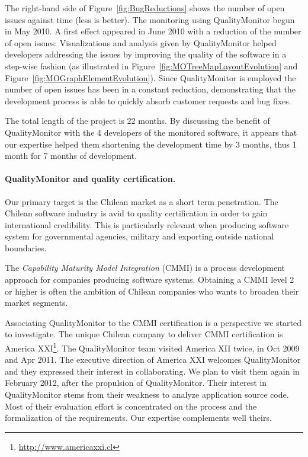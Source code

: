 \documentclass[runningheads]{llncs}
\newcommand{\figref}[1]{Figure~\ref{fig:#1}}
\begin{document}
The right-hand side of \figref{BugReductions} shows the number of open issues against time (less is better). The monitoring using QualityMonitor begun in May 2010. A first effect appeared in June 2010 with a reduction of the number of open issues: Visualizations and analysis given by QualityMonitor helped developers addressing the issues by improving the quality of the software in a step-wise fashion (as illustrated in \figref{MOTreeMapLayoutEvolution} and \figref{MOGraphElementEvolution}). Since QualityMonitor is employed the number of open issues has been in a constant reduction, demonstrating that the development process is able to quickly absorb customer requests and bug fixes.

The total length of the project is 22 months. By discussing the benefit of QualityMonitor with the 4 developers of the monitored software, it appears that our expertise helped them shortening the development time by 3 months, thus 1 month for 7 months of development.

\paragraph{QualityMonitor and quality certification.}
Our primary target is the Chilean market as a short term penetration. The Chilean software industry is avid to quality certification in order to gain international credibility. This is particularly relevant when producing software system for governmental agencies, military and exporting outside national boundaries.

The \emph{Capability Maturity Model Integration} (CMMI) is a process development approach for companies producing software systems. Obtaining a CMMI level 2 or higher is often the ambition of Chilean companies who wants to broaden their market segments.

Associating QualityMonitor to the CMMI certification is a perspective we started to investigate. The unique Chilean company to deliver CMMI certification is America XXI\footnote{\url{http://www.americaxxi.cl}}. The QualityMonitor team visited America XII twice, in Oct 2009 and Apr 2011. The executive direction of America XXI welcomes QualityMonitor and they expressed their interest in collaborating. We plan to visit them again in February 2012, after the propulsion of QualityMonitor. Their interest in QualityMonitor stems from their weakness to analyze application source code. Most of their evaluation effort is concentrated on the process and the formalization of the requirements. Our expertise complements well theirs.
\end{document}
